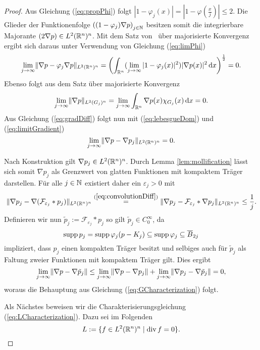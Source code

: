 \begin{proof}
  Aus Gleichung (\ref{eq:propPhi}) folgt $|1 - \varphi_j(x)| = |1 - \varphi(\tfrac{x}{j})| \leq 2$. 
  Die Glieder der Funktionenfolge $\left((1 - \varphi_j)\nabla p\right)_{j \in \mathbb{N}}$ besitzen somit die integrierbare Majorante $(2 \nabla p) \in L^2(\mathbb{R}^n)^n$.
  Mit dem Satz von \lebesgue\ über majorisierte Konvergenz ergibt sich daraus unter Verwendung von Gleichung (\ref{eq:limPhi})
  \begin{equation}
    \label{eq:lebesgueDom}
  \lim_{j \to \infty} \lVert \nabla p - \varphi_j \nabla p \rVert_{L^2(\mathbb{R}^n)^n}
  = \left( \int_{\mathbb{R}^n} (\lim_{j \to \infty} |1 - \varphi_j(x)|^2 ) |\nabla p(x)|^2 \, {\operatorname{d}\!{x}} \right)^\frac{1}{2} = 0.
  \end{equation}
  Ebenso folgt aus dem Satz über majorisierte Konvergenz 
  \begin{equation}
    \label{eq:limitGradient}
  \lim_{j \to \infty} \lVert \nabla p \rVert_{L^2(G_j)^n}
  = \lim_{j \to \infty} \int_{\mathbb{R}^n} \nabla p(x) \chi_{G_j}(x) \, {\operatorname{d}\!{x}}
  = 0.
  \end{equation}
  Aus Gleichung (\ref{eq:gradDiff}) folgt nun mit (\ref{eq:lebesgueDom}) und (\ref{eq:limitGradient})
  $$
    \lim_{j \to \infty} \lVert \nabla p - \nabla p_j \rVert_{L^2(\mathbb{R}^n)^n} = 0.
  $$

  Nach Konstruktion gilt $\nabla p_j \in L^2(\mathbb{R}^n)^n$.
  Durch Lemma \ref{lem:mollification} lässt sich somit $\nabla p_j$ als Grenzwert von glatten Funktionen mit kompaktem Träger darstellen. Für alle $j \in \mathbb{N}$ existiert daher ein $\varepsilon_j > 0$ mit
  $$
  \lVert \nabla p_j - \nabla (\mathcal{F}_{\varepsilon_j} \ast p_j) \rVert_{L^2(\mathbb{R}^n)^n}
  \overset{(\ref{eq:convolutionDiff})}{=} \lVert \nabla p_j - \mathcal{F}_{\varepsilon_j} \ast \nabla p_j \rVert_{L^2(\mathbb{R}^n)^n}
  \leq \frac{1}{j}.
  $$
  Definieren wir nun $\tilde p_j := \mathcal{F}_{\varepsilon_j} \ast p_j$ so gilt $\tilde p_j \in C_0^\infty$, da 
  $$
  \operatorname{supp} p_j = \operatorname{supp} \varphi_j(p - K_j) 
  \subseteq \operatorname{supp} \varphi_j
  \subseteq \overline B_{2j}
  $$
  impliziert, dass $p_j$ einen kompakten Träger besitzt und selbiges auch für $\tilde p_j$ als Faltung zweier Funktionen mit kompaktem Träger gilt.
  Dies ergibt
  $$
  \lim_{j \to \infty} \lVert \nabla p - \nabla \tilde p_j \rVert
  \leq 
  \lim_{j \to \infty} \lVert \nabla p - \nabla p_j \rVert + \lim_{j \to \infty} \lVert \nabla p_j - \nabla \tilde p_j \rVert
  = 0,
  $$
  woraus die Behauptung aus Gleichung (\ref{eq:GCharacterization}) folgt.

  Als Nächstes beweisen wir die Charakterisierungsgleichung (\ref{eq:LCharacterization}).
  Dazu sei im Folgenden
  $$
  L := \{ f \in L^2(\mathbb{R}^n)^n \mid \mathrm{div\,} f = 0 \}.
  $$


\end{proof}
